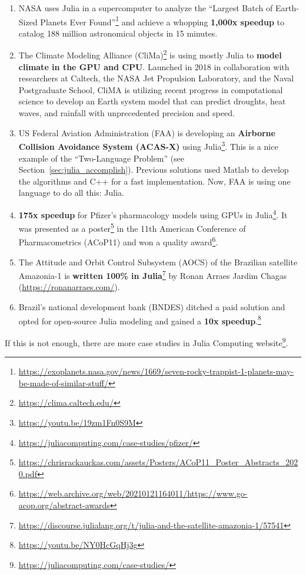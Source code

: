 \documentclass[
  notoc %
]{tufte-book}
\DeclareRobustCommand{\href}[2]{#2\footnote{\url{#1}}}
\providecommand{\tightlist}{%
  \setlength{\itemsep}{0pt}\setlength{\parskip}{0pt}
}
\begin{document}
\begin{enumerate}
\def\labelenumi{\arabic{enumi}.}
\tightlist
\item
  NASA uses Julia in a supercomputer to analyze the
  \href{https://exoplanets.nasa.gov/news/1669/seven-rocky-trappist-1-planets-may-be-made-of-similar-stuff/}{``Largest
  Batch of Earth-Sized Planets Ever Found''} and achieve a whopping
  \textbf{1,000x speedup} to catalog 188 million astronomical objects in
  15 minutes.
\item
  \href{https://clima.caltech.edu/}{The Climate Modeling Alliance
  (CliMa)} is using mostly Julia to \textbf{model climate in the GPU and
  CPU}. Launched in 2018 in collaboration with researchers at Caltech,
  the NASA Jet Propulsion Laboratory, and the Naval Postgraduate School,
  CliMA is utilizing recent progress in computational science to develop
  an Earth system model that can predict droughts, heat waves, and
  rainfall with unprecedented precision and speed.
\item
  \href{https://youtu.be/19zm1Fn0S9M}{US Federal Aviation Administration
  (FAA) is developing an \textbf{Airborne Collision Avoidance System
  (ACAS-X)} using Julia}. This is a nice example of the ``Two-Language
  Problem'' (see Section~\ref{sec:julia_accomplish}). Previous solutions
  used Matlab to develop the algorithms and C++ for a fast
  implementation. Now, FAA is using one language to do all this: Julia.
\item
  \href{https://juliacomputing.com/case-studies/pfizer/}{\textbf{175x
  speedup} for Pfizer's pharmacology models using GPUs in Julia}. It was
  presented as a
  \href{https://chrisrackauckas.com/assets/Posters/ACoP11_Poster_Abstracts_2020.pdf}{poster}
  in the 11th American Conference of Pharmacometrics (ACoP11) and
  \href{https://web.archive.org/web/20210121164011/https://www.go-acop.org/abstract-awards}{won
  a quality award}.
\item
  \href{https://discourse.julialang.org/t/julia-and-the-satellite-amazonia-1/57541}{The
  Attitude and Orbit Control Subsystem (AOCS) of the Brazilian satellite
  Amazonia-1 is \textbf{written 100\% in Julia}} by Ronan Arraes Jardim
  Chagas (\url{https://ronanarraes.com/}).
\item
  \href{https://youtu.be/NY0HcGqHj3g}{Brazil's national development bank
  (BNDES) ditched a paid solution and opted for open-source Julia
  modeling and gained a \textbf{10x speedup}.}
\end{enumerate}

If this is not enough, there are more case studies in
\href{https://juliacomputing.com/case-studies/}{Julia Computing
website}.
\end{document}

